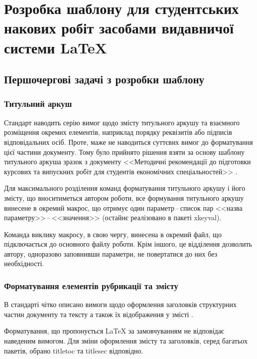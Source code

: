 \chapter{Розробка шаблону для студентських накових робіт засобами видавничої системи \LaTeX{}} 
\label{chap:second}

\section{Першочергові задачі з розробки шаблону}

\subsection{Титульний аркуш}

Стандарт наводить серію вимог \cite[с.~15]{DSTU20153008} щодо змісту титульного аркушу та взаємного розміщення окремих елементів, наприклад порядку реквізитів або підписів відповідальних осіб. Проте, маже не наводиться суттєвих вимог до форматування цієї частини документу. Тому було прийнято рішення взяти за основу шаблону титульного аркуша зразок з документу <<Методичні рекомендації до підготовки курсових та випускних робіт для студентів економічних спеціальностей>> \cite[c.~39]{doc:methodika:1}.

Для максимального розділення команд форматування титульного аркушу і його змісту, що вноситиметься автором роботи, все формування титульного аркушу винесене в окремий макрос, що отримує один параметр\,--\,список пар <<назва параметру>>\,--\,<<значення>> (остайнє реалізовано в пакеті xkeyval).

Команда виклику макросу, в свою чергу, винесена в окремий файл, що підключається до основного файлу роботи. Крім іншого, це відділення дозволить автору, одноразово заповнивши параметри, не повертатися до них без необхідності.

\subsection{Форматування елементів рубрикації та змісту}
\label{dev:toc}

В стандарті чітко описано вимоги щодо оформлення заголовків структурних частин документу та тексту а також їх відображення у змісті \cite[с.~4]{DSTU20153008}\cite[с.~8]{DSTU20153008}.

Форматування, що пропонується \LaTeX{} за замовчуванням не відповідає наведеним вимогом. Для зміни оформлення змісту та заголовків, серед багатьох пакетів, обрано titletoc та titlesec відповідно.

